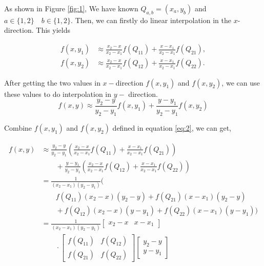     As shown in Figure \ref{fig:1}, We have known $Q_{a, b} = (x_a, y_ b)$ and $a\in\{1, 2\}\quad b\in\{1,2\}$. Then, we can firstly do linear interpolation in the $x$-direction. This yields

    \begin{equation}
        \begin{aligned}
            f(x,y_{1})&\approx {\frac {x_{2}-x}{x_{2}-x_{1}}}f(Q_{11})+{\frac {x-x_{1}}{x_{2}-x_{1}}}f(Q_{21}),\\f(x,y_{2})&\approx {\frac {x_{2}-x}{x_{2}-x_{1}}}f(Q_{12})+{\frac {x-x_{1}}{x_{2}-x_{1}}}f(Q_{22}).
        \end{aligned}
        \label{eq:2}
    \end{equation}

    After getting the two values in $x-$direction $f(x, y_1)$ and $f(x, y_2)$, we can use these values to do interpolation in $y-$ direction.
    \begin{equation}
        f(x,y) \approx {\frac {y_{2}-y}{y_{2}-y_{1}}}f(x,y_{1})+{\frac {y-y_{1}}{y_{2}-y_{1}}}f(x,y_{2})
    \end{equation}

    Combine $f(x, y_1)$ and $f(x, y_2)$ defined in equation \ref{eq:2}, we can get,

    \begin{equation}
        \begin{aligned}
        f(x,y)&\approx{\frac {y_{2}-y}{y_{2}-y_{1}}}\left({\frac {x_{2}-x}{x_{2}-x_{1}}}f(Q_{11})+{\frac {x-x_{1}}{x_{2}-x_{1}}}f(Q_{21})\right)\\&\qquad+{\frac {y-y_{1}}{y_{2}-y_{1}}}\left({\frac {x_{2}-x}{x_{2}-x_{1}}}f(Q_{12})+{\frac {x-x_{1}}{x_{2}-x_{1}}}f(Q_{22})\right)\\&={\frac {1}{(x_{2}-x_{1})(y_{2}-y_{1})}}{\big (}\\&\qquad f(Q_{11})(x_{2}-x)(y_{2}-y)+f(Q_{21})(x-x_{1})(y_{2}-y)\\&\qquad+f(Q_{12})(x_{2}-x)(y-y_{1})+f(Q_{22})(x-x_{1})(y-y_{1}){\big )}\\&={\frac {1}{(x_{2}-x_{1})(y_{2}-y_{1})}}{\begin{bmatrix}x_{2}-x&x-x_{1}\end{bmatrix}}\\&\qquad \cdot {\begin{bmatrix}f(Q_{11})&f(Q_{12})\\f(Q_{21})&f(Q_{22})\end{bmatrix}}{\begin{bmatrix}y_{2}-y\\y-y_{1}\end{bmatrix}}
        \end{aligned}
    \end{equation}

